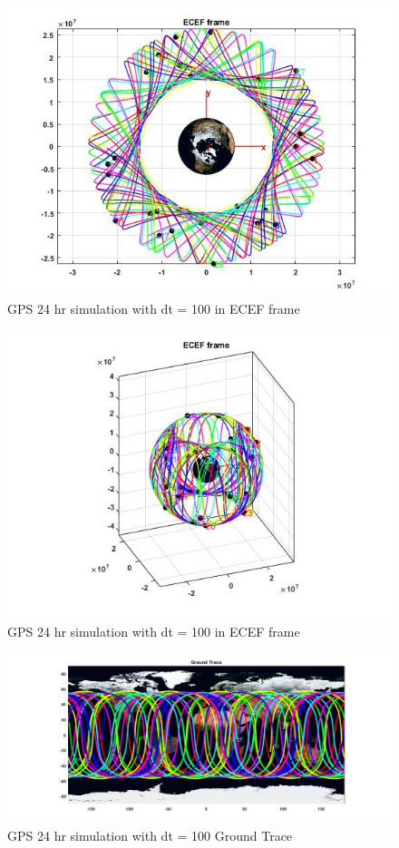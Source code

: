 \documentclass[Space3_Assign2]{subfile}
\begin{document}
\begin{figure}
\centering
\caption{GPS 24 hr simulation with dt = 100 in ECEF frame}
\label{Q1AECEF}
\includegraphics[width = \linewidth]{./Q1AECEF.jpg}
\end{figure}

\begin{figure}
\centering
\caption{GPS 24 hr simulation with dt = 100 in ECEF frame}
\label{Q1AECEFside}
\includegraphics[width = \linewidth]{./Q1AECEF_side.jpg}
\end{figure}

\begin{figure}
\centering
\caption{GPS 24 hr simulation with dt = 100 Ground Trace}
\label{Q1AGT}
\includegraphics[width = \linewidth]{./Q1AGT.jpg}
\end{figure}
\end{document}
